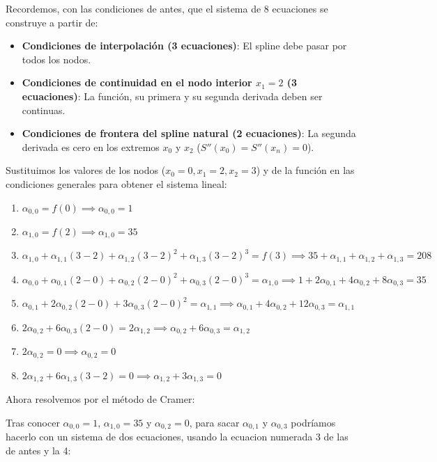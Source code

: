 \documentclass{article}
\begin{document}
Recordemos, con las condiciones de antes, que el sistema de 8 ecuaciones se construye a partir de:
\begin{itemize}
    \item \textbf{Condiciones de interpolación (3 ecuaciones)}: El spline debe pasar por todos los nodos.
    \item \textbf{Condiciones de continuidad en el nodo interior $x_1=2$ (3 ecuaciones)}: La función, su primera y su segunda derivada deben ser continuas.
    \item \textbf{Condiciones de frontera del spline natural (2 ecuaciones)}: La segunda derivada es cero en los extremos $x_0$ y $x_2$ ($S''(x_0)=S''(x_n)=0$).
\end{itemize}

Sustituimos los valores de los nodos (\(x_0=0, x_1=2, x_2=3\)) y de la función en las condiciones generales para obtener el sistema lineal:
\begin{enumerate}
    \item \(\alpha_{0,0} = f(0) \implies \alpha_{0,0} = 1\)
    \item \(\alpha_{1,0} = f(2) \implies \alpha_{1,0} = 35\)
    \item \(\alpha_{1,0} + \alpha_{1,1}(3-2) + \alpha_{1,2}(3-2)^2 + \alpha_{1,3}(3-2)^3 = f(3)
          \implies 35 + \alpha_{1,1} + \alpha_{1,2} + \alpha_{1,3} = 208\)
    \item \(\alpha_{0,0} + \alpha_{0,1}(2-0) + \alpha_{0,2}(2-0)^2 + \alpha_{0,3}(2-0)^3 = \alpha_{1,0}
          \implies 1 + 2\alpha_{0,1} + 4\alpha_{0,2} + 8\alpha_{0,3} = 35\)
    \item \(\alpha_{0,1} + 2\alpha_{0,2}(2-0) + 3\alpha_{0,3}(2-0)^2 = \alpha_{1,1}
          \implies \alpha_{0,1} + 4\alpha_{0,2} + 12\alpha_{0,3} = \alpha_{1,1}\)
    \item \(2\alpha_{0,2} + 6\alpha_{0,3}(2-0) = 2\alpha_{1,2}
          \implies \alpha_{0,2} + 6\alpha_{0,3} = \alpha_{1,2}\)
    \item \(2\alpha_{0,2} = 0 \implies \alpha_{0,2} = 0\)
    \item \(2\alpha_{1,2} + 6\alpha_{1,3}(3-2) = 0 \implies \alpha_{1,2} + 3\alpha_{1,3} = 0\)
\end{enumerate}

Ahora resolvemos por el método de Cramer:

Tras conocer \(\alpha_{0,0}=1\), \(\alpha_{1,0}=35\) y \(\alpha_{0,2}=0\), para sacar \(\alpha_{0,1}\) y \(\alpha_{0,3}\) podríamos hacerlo con un sistema de dos ecuaciones, usando la ecuacion numerada 3 de las de antes y la  4:
\end{document}
